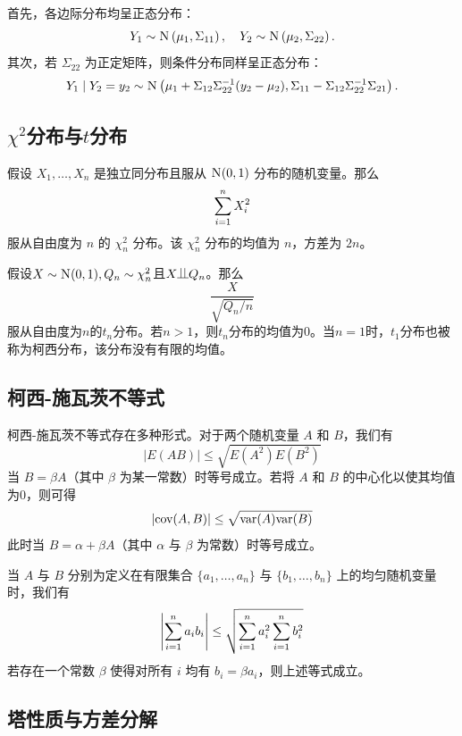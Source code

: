 首先，各边际分布均呈正态分布：
$$
Y_{1}  \sim\textsc{N}\left(\mu_{1},\Sigma_{11}\right),\quad 
Y_{2}  \sim\textsc{N}\left(\mu_{2},\Sigma_{22}\right).
$$
其次，若 $\Sigma_{22}$ 为正定矩阵，则条件分布同样呈正态分布：
\[
Y_{1}\mid Y_{2}=y_{2}\sim\textsc{N}\left(\mu_{1}+\Sigma_{12}\Sigma_{22}^{-1}(y_{2}-\mu_{2}),\Sigma_{11}-\Sigma_{12}\Sigma_{22}^{-1}\Sigma_{21}\right).
\]
 

 
 
 \subsection{$\chi^2$分布与$t$分布}
\label{subsection::chi2-t-distribution}



假设 $X_1,\ldots, X_n$ 是独立同分布且服从 $\N01$ 分布的随机变量。那么
$$
\sum_{i=1}^n X_i^2 
$$
服从自由度为 $n$ 的 $\chi^2_n$ 分布。该 $\chi^2_n$ 分布的均值为 $n$，方差为 $2n$。 



假设$X\sim \N01, Q_n\sim \chi^2_n$且$X\ind Q_n$。那么
$$
\frac{X}{  \sqrt{Q_n / n} }
$$
服从自由度为$n$的$t_n$分布。若$n>1$，则$t_n$分布的均值为0。当$n=1$时，$t_1$分布也被称为柯西分布，该分布没有有限的均值。 







\subsection{柯西-施瓦茨不等式}\label{sec::cauchy-schwarz-inequality}

 
柯西-施瓦茨不等式存在多种形式。对于两个随机变量 $A$ 和 $B$，我们有
$$
 | E(AB)  | \leq \sqrt{   E(A^2) E(B^2)  }
$$
当 $B = \beta A$（其中 $\beta$ 为某一常数）时等号成立。若将 $A$ 和 $B$ 的中心化以使其均值为0，则可得
$$
| \textup{cov}(A, B)  | \leq \sqrt{   \textup{var}(A) \textup{var}(B)  } 
$$
此时当 $B = \alpha + \beta A$（其中 $\alpha$ 与 $\beta$ 为常数）时等号成立。

当 $A$ 与 $B$ 分别为定义在有限集合 $\{ a_1, \ldots, a_n \}$ 与 $\{ b_1, \ldots, b_n \}$ 上的均匀随机变量时，我们有
$$
 \left|  \sum_{i=1}^n a_i b_i  \right| \leq \sqrt{  \sum_{i=1}^n a_i^2   \sum_{i=1}^n b_i^2  }
$$
若存在一个常数 $\beta$ 使得对所有 $i$ 均有 $b_i =  \beta a_i$，则上述等式成立。 
 
 



\subsection{塔性质与方差分解}\label{appendix::tower-property}

